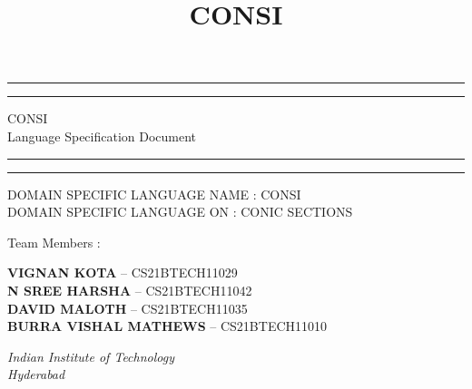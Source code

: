 \documentclass[12pt]{fphw}
\title{CONSI}
\begin{document}
\begin{titlepage} %

	\centering %
	
	\scshape %
	
	\vspace*{\baselineskip} %
	
	
	\rule{\textwidth}{1.6pt}\vspace*{-\baselineskip}\vspace*{2pt} %
	\rule{\textwidth}{0.4pt} %
	
	\vspace{0.75\baselineskip} %
	
	{\Large CONSI\\
  \large Language Specification Document} %
	
	\vspace{0.75\baselineskip} %
	
	\rule{\textwidth}{0.4pt}\vspace*{-\baselineskip}\vspace{3.2pt} %
	\rule{\textwidth}{1.6pt} %
	
	\vspace{2\baselineskip} %
 
	DOMAIN SPECIFIC LANGUAGE NAME :  CONSI\\
DOMAIN SPECIFIC LANGUAGE ON       :  CONIC SECTIONS
	
	\vspace*{3\baselineskip} %

	Team Members :
	
	\vspace{0.5\baselineskip} %
	
	{\textbf{VIGNAN KOTA} -- CS21BTECH11029\\
\textbf{N SREE HARSHA} -- CS21BTECH11042\\
\textbf{DAVID MALOTH} -- CS21BTECH11035}\\
\textbf{BURRA VISHAL MATHEWS} -- CS21BTECH11010\\

	
	\vspace{0.5\baselineskip} %
	
	\textit{Indian Institute of Technology\\Hyderabad} %
	
	\vfill %

	
	\vspace{0.3\baselineskip} %
	

\end{titlepage}
\end{document}
